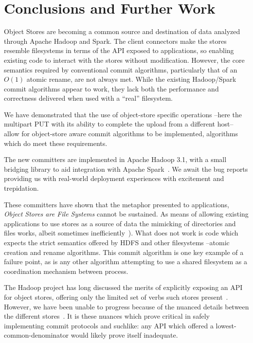 \documentclass[conference]{IEEEtran}
\begin{document}
\section{Conclusions and Further Work}
\label{sec:conclusions}

Object Stores are becoming a common source and destination of data analyzed
through Apache Hadoop and Spark.
The client connectors make the stores resemble filesystems in
terms of the API exposed to applications, so enabling existing code to
interact with the stores without modification.
However, the core semantics required by conventional commit algorithms, particularly
that of an $O(1)$ atomic rename, are not always met.
While the existing Hadoop/Spark commit algorithms appear to work, they lack
both the performance and correctness delivered when used with a ``real'' filesystem.

We have demonstrated that the use of object-store specific operations --here
the multipart PUT with its ability to complete the upload from a different host--
allow for object-store aware commit algorithms to be implemented,
algorithms which do meet these requirements.

The new committers are implemented in Apache Hadoop 3.1, with a small bridging
library to aid integration with Apache Spark\ \cite{HADOOP-13786}.
We await the bug reports providing us with real-world deployment experiences
with excitement and trepidation.


These committers have shown that the metaphor presented to applications,
\emph{Object Stores are File Systems} cannot be sustained.
As means of allowing existing applications to use stores as a source
of data the mimicking of directories and files works, albeit sometimes
inefficiently\ \cite{HADOOP-13208}).
What does not work is code which expects the strict semantics
offered by HDFS and other filesystems --atomic creation and rename algorithms.
This commit algorithm is one key example of a failure point, as
is any other algorithm attempting to use a shared filesystem
as a coordination mechanism between process.

The Hadoop project has long discussed the merits of explicitly
exposing an API for object stores, offering only the limited
set of verbs such stores present\ \cite{HADOOP-9565}.
However, we have been unable to progress because of the nuanced details
between the different stores\ \cite{S3, WASB, ADL, GCS}.
It is these nuances which prove critical in safely implementing
commit protocols and suchlike: any API which offered a lowest-common-denominator
would likely prove itself inadequate.
\end{document}
